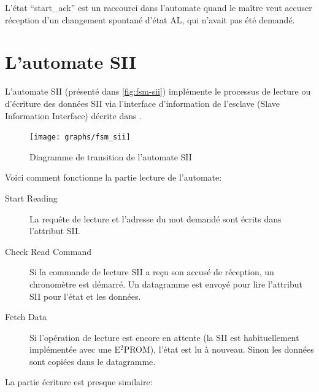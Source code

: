 \documentclass[a4paper,12pt,BCOR=6mm,bibtotoc,idxtotoc]{scrbook}
\begin{document}
L'\'etat ``start\_ack'' est un raccourci dans l'automate quand le
ma\^itre veut accuser r\'eception d'un changement spontan\'e d'\'etat
AL, qui n'avait pas \'et\'e demand\'e.


\section{L'automate SII}
\label{sec:fsm-sii}

L'automate SII (pr\'esent\'e dans \autoref{fig:fsm-sii})
impl\'emente le processus de lecture ou d'\'ecriture des donn\'ees
SII via l'interface d'information de l'esclave (Slave Information
Interface) d\'ecrite dans \cite[sec.~6.4]{dlspec}.

\begin{figure}[htbp]
  \centering
  \texttt{[image: graphs/fsm\_sii]}
  \caption{Diagramme de transition de l'automate SII}
  \label{fig:fsm-sii}
\end{figure}

Voici comment fonctionne la partie lecture de l'automate:

\begin{description}

\item[Start Reading] La requ\^ete de lecture et l'adresse du
  mot demand\'e sont \'ecrits dans l'attribut SII.

\item[Check Read Command] Si la commande de lecture SII a re\c{c}u son
  accus\'e de r\'eception, un chronom\`etre est d\'emarr\'e. Un
  datagramme est envoy\'e pour lire l'attribut SII pour l'\'etat et
  les donn\'ees.

\item[Fetch Data] Si l'op\'eration de lecture est encore en attente
  (la SII est habituellement impl\'ement\'ee avec une E$^2$PROM),
  l'\'etat est lu \`a nouveau. Sinon les donn\'ees sont copi\'ees dans
  le datagramme.

\end{description}

La partie \'ecriture est presque similaire:
\end{document}
